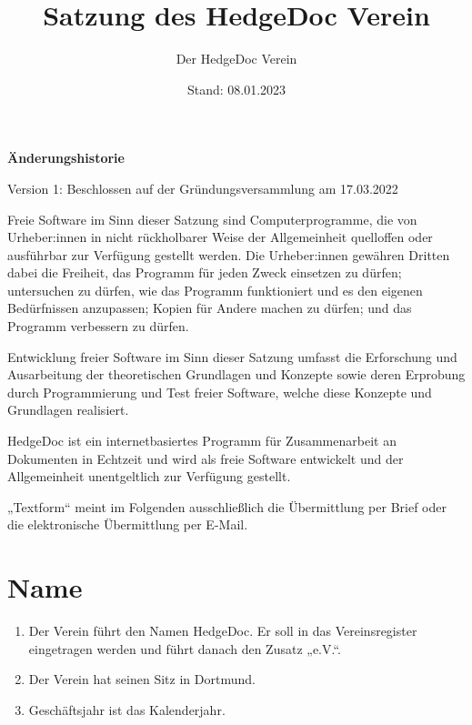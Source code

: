 \documentclass[12pt,paper=a4,ngerman]{scrreprt}
\author{Der HedgeDoc Verein}
\title{Satzung des HedgeDoc Verein}
\date{Stand: 08.01.2023}
\begin{document}
	\maketitle
	\newpage
	
	\textbf{Änderungshistorie}
	\begin{description}
		\item
			Version 1: Beschlossen auf der Gründungsversammlung am 17.03.2022
	\end{description}
	\newpage
	
	\tableofcontents
	\newpage
	
        Freie Software im Sinn dieser Satzung sind Computerprogramme, die von Urheber:innen in nicht rückholbarer Weise der Allgemeinheit quelloffen oder ausführbar zur Verfügung gestellt werden. Die Urheber:innen gewähren Dritten dabei die Freiheit, das Programm für jeden Zweck einsetzen zu dürfen; untersuchen zu dürfen, wie das Programm funktioniert und es den eigenen Bedürfnissen anzupassen; Kopien für Andere machen zu dürfen; und das Programm verbessern zu dürfen.
        
        Entwicklung freier Software im Sinn dieser Satzung umfasst die Erforschung und Ausarbeitung der theoretischen Grundlagen und Konzepte sowie deren Erprobung durch Programmierung und Test freier Software, welche diese Konzepte und Grundlagen realisiert.
        
        HedgeDoc ist ein internetbasiertes Programm für Zusammenarbeit an Dokumenten in Echtzeit und wird als freie Software entwickelt und der Allgemeinheit unentgeltlich zur Verfügung gestellt.
        
        „Textform“ meint im Folgenden ausschließlich die Übermittlung per Brief oder die elektronische Übermittlung per E-Mail.
    
	\section{Name}
	\begin{enumerate}
		\item
			Der Verein führt den Namen HedgeDoc. Er soll in das Vereinsregister eingetragen werden und führt danach den Zusatz „e.V.“.
		\item
			Der Verein hat seinen Sitz in Dortmund.
		\item
			Geschäftsjahr ist das Kalenderjahr.
	\end{enumerate}
	
\end{document}

